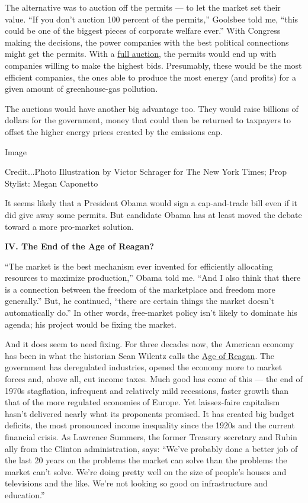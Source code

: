 The alternative was to auction off the permits --- to let the market set
their value. ``If you don't auction 100 percent of the permits,''
Goolsbee told me, ``this could be one of the biggest pieces of corporate
welfare ever.'' With Congress making the decisions, the power companies
with the best political connections might get the permits. With a
\href{http://gregmankiw.blogspot.com/2008/05/mccain-vs-obama-carbon-auctions.html}{full
auction}, the permits would end up with companies willing to make the
highest bids. Presumably, these would be the most efficient companies,
the ones able to produce the most energy (and profits) for a given
amount of greenhouse-gas pollution.

The auctions would have another big advantage too. They would raise
billions of dollars for the government, money that could then be
returned to taxpayers to offset the higher energy prices created by the
emissions cap.

Image

Credit...Photo Illustration by Victor Schrager for The New York Times;
Prop Stylist: Megan Caponetto

It seems likely that a President Obama would sign a cap-and-trade bill
even if it did give away some permits. But candidate Obama has at least
moved the debate toward a more pro-market solution.

\textbf{IV. The End of the Age of Reagan?}

``The market is the best mechanism ever invented for efficiently
allocating resources to maximize production,'' Obama told me. ``And I
also think that there is a connection between the freedom of the
marketplace and freedom more generally.'' But, he continued, ``there are
certain things the market doesn't automatically do.'' In other words,
free-market policy isn't likely to dominate his agenda; his project
would be fixing the market.

And it does seem to need fixing. For three decades now, the American
economy has been in what the historian Sean Wilentz calls the
\href{http://www.harpercollins.com/books/9780060744809/The_Age_of_Reagan/index.aspx}{Age
of Reagan}. The government has deregulated industries, opened the
economy more to market forces and, above all, cut income taxes. Much
good has come of this --- the end of 1970s stagflation, infrequent and
relatively mild recessions, faster growth than that of the more
regulated economies of Europe. Yet laissez-faire capitalism hasn't
delivered nearly what its proponents promised. It has created big budget
deficits, the most pronounced income inequality since the 1920s and the
current financial crisis. As Lawrence Summers, the former Treasury
secretary and Rubin ally from the Clinton administration, says: ``We've
probably done a better job of the last 20 years on the problems the
market can solve than the problems the market can't solve. We're doing
pretty well on the size of people's houses and televisions and the like.
We're not looking so good on infrastructure and education.''

